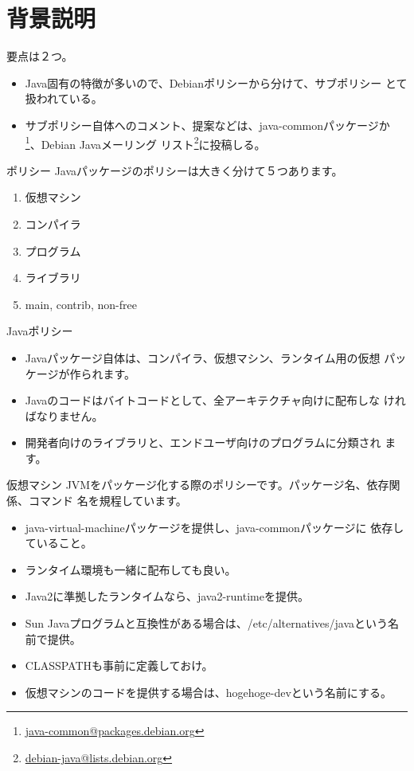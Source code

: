 \section{背景説明}

\begin{frame}{要点は２つ。}
 \begin{itemize}
  \item Java固有の特徴が多いので、Debianポリシーから分けて、サブポリシー
	とて扱われている。
  \item サブポリシー自体へのコメント、提案などは、java-commonパッケージか
	\footnote{\url{java-common@packages.debian.org}}、Debian Javaメーリング
	リスト\footnote{\url{debian-java@lists.debian.org}}に投稿しる。
 \end{itemize}
\end{frame}

\begin{frame}{ポリシー}
Javaパッケージのポリシーは大きく分けて５つあります。
 \begin{enumerate}
  \item 仮想マシン
  \item コンパイラ
  \item プログラム
  \item ライブラリ
  \item main, contrib, non-free
 \end{enumerate}
\end{frame}

\begin{frame}{Javaポリシー}
 \begin{itemize}
  \item Javaパッケージ自体は、コンパイラ、仮想マシン、ランタイム用の仮想
	パッケージが作られます。
  \item Javaのコードはバイトコードとして、全アーキテクチャ向けに配布しな
	ければなりません。
  \item 開発者向けのライブラリと、エンドユーザ向けのプログラムに分類され
	ます。
 \end{itemize}
\end{frame}

\begin{frame}{仮想マシン}
JVMをパッケージ化する際のポリシーです。パッケージ名、依存関係、コマンド
 名を規程しています。\\
 \begin{itemize}
  \item java-virtual-machineパッケージを提供し、java-commonパッケージに
	依存していること。
  \item ランタイム環境も一緒に配布しても良い。
  \item Java2に準拠したランタイムなら、java2-runtimeを提供。
  \item Sun Javaプログラムと互換性がある場合は、/etc/alternatives/javaという名前で提供。
  \item CLASSPATHも事前に定義しておけ。
  \item 仮想マシンのコードを提供する場合は、hogehoge-devという名前にする。
 \end{itemize}
 \end{frame}


